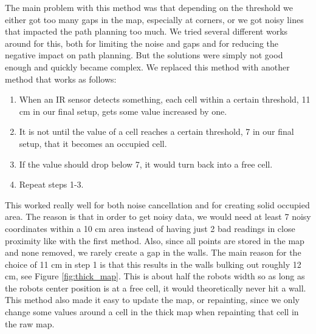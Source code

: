 The main problem with this method was that depending on the threshold we either got too many gaps in the map, especially at corners, or we got noisy lines that impacted the path planning too much. We tried several different works around for this, both for limiting the noise and gaps and for reducing the negative impact on path planning. But the solutions were simply not good enough and quickly became complex. We replaced this method with another method that works as follows:

\begin{enumerate}
\item When an IR sensor detects something, each cell within a certain threshold, 11 cm in our final setup, gets some value increased by one. 
\item It is not until the value of a cell reaches a certain threshold, 7 in our final setup, that it becomes an occupied cell. 
\item If the value should drop below 7, it would turn back into a free cell.
\item Repeat steps 1-3. 
\end{enumerate}

This worked really well for both noise cancellation and for creating solid occupied area. The reason is that in order to get noisy data, we would need at least 7 noisy coordinates within a 10 cm area instead of having just 2 bad readings in close proximity like with the first method. Also, since all points are stored in the map and none removed, we rarely create a gap in the walls. The main reason for the choice of 11 cm in step 1 is that this results in the walls bulking out roughly 12 cm, see Figure \ref{fig:thick_map}. This is about half the robots width so as long as the robots center position is at a free cell, it would theoretically never hit a wall. This method also made it easy to update the map, or repainting, since we only change some values around a cell in the thick map when repainting that cell in the raw map. 


